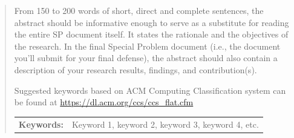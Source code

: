 \begin{abstract}
From 150 to 200 words of short, direct and complete sentences, the abstract 
should be informative enough to serve as a substitute for reading the entire SP document 
itself.  It states the rationale and the objectives of the research.  
In the final Special Problem  document (i.e., the document you'll submit for your final defense), the  abstract should also contain a description of your research results, findings,  and contribution(s).


Suggested keywords based on ACM Computing Classification system can be found at \url{https://dl.acm.org/ccs/ccs_flat.cfm}

\begin{flushleft}
\begin{tabular}{lp{4.25in}}
\hspace{-0.5em}\textbf{Keywords:}\hspace{0.25em} & Keyword 1, keyword 2, keyword 3, keyword 4, etc.\\
\end{tabular}
\end{flushleft}
\end{abstract}
